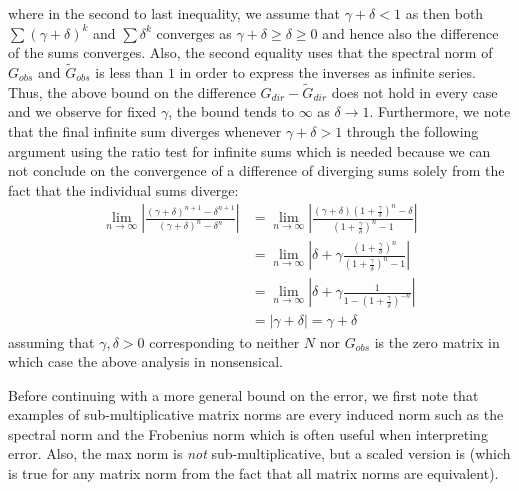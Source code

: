 \documentclass[../Thesis.tex]{subfiles}
\begin{document}
where in the second to last inequality, we assume that $\gamma + \delta < 1$ as then both $\sum \left(\gamma + \delta\right)^k$ and $\sum \delta^k$ converges as $\gamma + \delta \geq \delta \geq 0$ and hence also the difference of the sums converges. Also, the second equality uses that the spectral norm of $G_{obs}$ and $\tilde{G}_{obs}$ is less than $1$ in order to express the inverses as infinite series. Thus, the above bound on the difference $G_{dir} - \tilde{G}_{dir}$ does not hold in every case and we observe for fixed $\gamma$, the bound tends to $\infty$ as $\delta \to 1$. Furthermore, we note that the final infinite sum diverges whenever $\gamma + \delta > 1$ through the following argument using the ratio test for infinite sums which is needed because we can not conclude on the convergence of a difference of diverging sums solely from the fact that the individual sums diverge:
\begin{align*}
    \lim_{n\to \infty} \left|\frac{ \left(\gamma + \delta\right)^{n+1} - \delta^{n+1}}{\left(\gamma + \delta\right)^n - \delta^n}\right| & = \lim_{n\to \infty}\left|\frac{ \left(\gamma + \delta\right) \left(1 + \frac{\gamma}{\delta}\right)^n - \delta}{\left(1 + \frac{\gamma}{\delta} \right)^n - 1}\right| \\
                                                                                                                                         & = \lim_{n\to \infty}\left|\delta + \gamma \frac{\left(1 + \frac{\gamma}{\delta} \right)^n}{\left(1 + \frac{\gamma}{\delta} \right)^n - 1}\right|                       \\
                                                                                                                                         & = \lim_{n\to \infty} \left|\delta + \gamma \frac{1}{1 - \left( 1 + \frac{\gamma}{\delta} \right) ^{-n}}\right|                                                         \\
                                                                                                                                         & = \left| \gamma + \delta \right| = \gamma + \delta
\end{align*}
assuming that $\gamma, \delta > 0$ corresponding to neither $N$ nor $G_{obs}$ is the zero matrix in which case the above analysis in nonsensical.

Before continuing with a more general bound on the error, we first note that examples of sub-multiplicative matrix norms are every induced norm such as the spectral norm and the Frobenius norm which is often useful when interpreting error. Also, the max norm is \textit{not} sub-multiplicative, but a scaled version is (which is true for any matrix norm from the fact that all matrix norms are equivalent).
\end{document}
